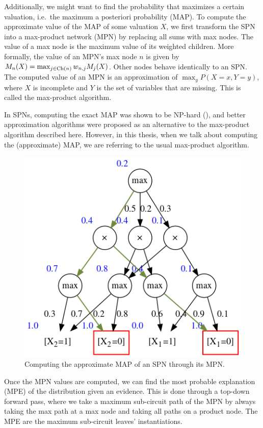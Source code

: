 Additionally, we might want to find the probability that maximizes a certain valuation, i.e.\ the
maximum a posteriori probability (MAP). To compute the approximate value of the MAP of some
valuation $X$, we first transform the SPN into a max-product network (MPN) by replacing all sums
with max nodes. The value of a max node is the maximum value of its weighted children. More
formally, the value of an MPN's max node $n$ is given by $M_n(X)=\max_{j\in\operatorname*{\text{Ch}}(n)} w_{n,j}M_j(X)$.
Other nodes behave identically to an SPN\@. The computed value of an MPN is an approximation of
$\max_y P(X=x, Y=y)$, where $X$ is incomplete and $Y$ is the set of variables that are missing.
This is called the max-product algorithm.

In SPNs, computing the exact MAP was shown to be NP-hard (\cite{theoretical-spn,cmc2017,mei2018}),
and better approximation algorithms were proposed as an alternative to the max-product algorithm
described here. However, in this thesis, when we talk about computing the (approximate) MAP, we are
referring to the usual max-product algorithm.

\begin{figure}[h]
  \centering\includegraphics[scale=0.6]{graphs/sample_mpn_prob.png}
  \caption{Computing the approximate MAP of an SPN through its MPN.\label{fig:sample_mpn_prob}}
\end{figure}

Once the MPN values are computed, we can find the most probable explanation (MPE) of the
distribution given an evidence. This is done through a top-down forward pass, where we take a
maximum sub-circuit path of the MPN by always taking the max path at a max node and taking all
paths on a product node. The MPE are the maximum sub-circuit leaves' instantiations.

